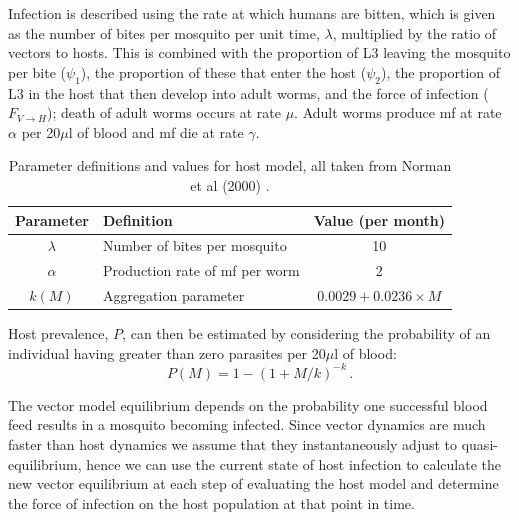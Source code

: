 Infection is described using the rate at which humans are bitten, which is given as the number of bites per mosquito per unit time, $\lambda$, multiplied by the ratio of vectors to hosts. This is combined with the proportion of L3 leaving the mosquito per bite ($\psi_1$), the proportion of these that enter the host ($\psi_2$), the proportion of L3 in the host that then develop into adult worms, and the force of infection ($F_{V\rightarrow H}$); death of adult worms occurs at rate $\mu$. Adult worms produce mf at rate $\alpha$ per 20$\mu$l of blood and mf die at rate $\gamma$.

\begin{table}[t]
\caption{Parameter definitions and values for host model, all taken from Norman et al (2000) \cite{Norman2000_epifil}.}%
\vspace{.1cm}
\centering %
\begin{tabular}{c l c}%
\hline\hline                        %
Parameter & Definition & Value (per month) \\ [0.5ex]%
\hline                  %
$\lambda$ & Number of bites per mosquito & 10 \\%
$\alpha$ & Production rate of mf per worm & 2  \\
$k(M)$ & Aggregation parameter & $0.0029+0.0236\times M$ \\[1ex]      %
\hline%
\end{tabular}
\label{table:param_host}%
\end{table}

Host prevalence, $P$, can then be estimated by considering the probability of an individual having greater than zero parasites per 20$\mu$l of blood:
\begin{equation}
P(M) = 1 - (1+M/k)^{-k}\,.
\label{eqn:prev}
\end{equation}

The vector model equilibrium depends on the probability one successful blood feed results in a mosquito becoming infected. Since vector dynamics are much faster than host dynamics we assume that they instantaneously adjust to quasi-equilibrium, hence we can use the current state of host infection to calculate the new vector equilibrium at each step of evaluating the host model and determine the force of infection on the host population at that point in time.

